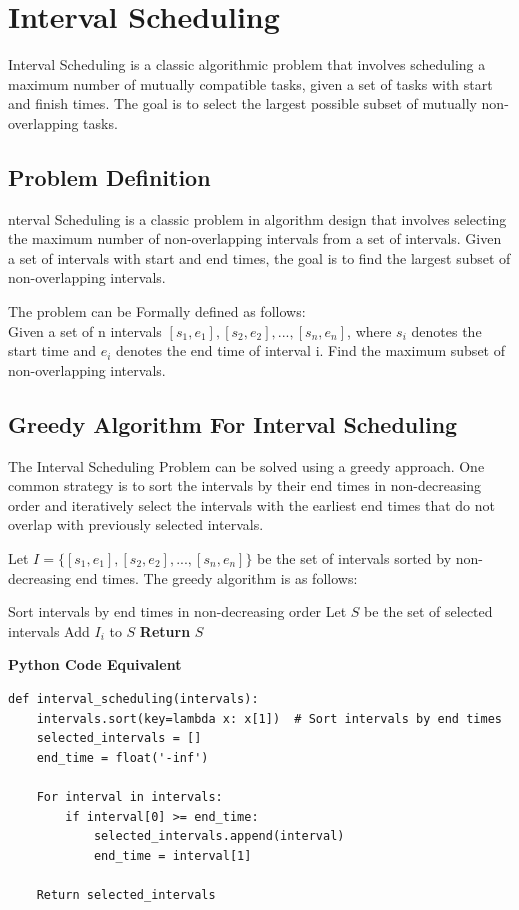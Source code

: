 \documentclass[12pt]{book} %
\begin{document}
\section{Interval Scheduling}
Interval Scheduling is a classic algorithmic problem that involves scheduling a maximum number of mutually compatible tasks, given a set of tasks with start and finish times. The goal is to select the largest possible subset of mutually non-overlapping tasks.

\subsection{Problem Definition}
nterval Scheduling is a classic problem in algorithm design that involves selecting the maximum number of non-overlapping intervals from a set of intervals. Given a set of intervals with start and end times, the goal is to find the largest subset of non-overlapping intervals.

The problem can be Formally defined as follows: \\
Given a set of n intervals $[s_1, e_1], [s_2, e_2], ..., [s_n, e_n]$, where $s_i$ denotes the start time and $e_i$ denotes the end time of interval i. Find the maximum subset of non-overlapping intervals.

\subsection{Greedy Algorithm For Interval Scheduling}
The Interval Scheduling Problem can be solved using a greedy approach. One common strategy is to sort the intervals by their end times in non-decreasing order and iteratively select the intervals with the earliest end times that do not overlap with previously selected intervals.

Let $I = \{[s_1, e_1], [s_2, e_2], ..., [s_n, e_n]\}$ be the set of intervals sorted by non-decreasing end times. The greedy algorithm is as follows:
\FloatBarrier
\begin{algorithm}
\caption{Interval Scheduling Algorithm}
\begin{algorithmic}[1]
\State Sort intervals by end times in non-decreasing order
\State Let $S$ be the set of selected intervals
\State Add $I_i$ to $S$
\EndIf
\EndFor
\State \textbf{Return} $S$
\end{algorithmic}
\end{algorithm}
\FloatBarrier
\textbf{Python Code Equivalent}
\begin{lstlisting}
def interval_scheduling(intervals):
    intervals.sort(key=lambda x: x[1])  # Sort intervals by end times
    selected_intervals = []
    end_time = float('-inf')
    
    For interval in intervals:
        if interval[0] >= end_time:
            selected_intervals.append(interval)
            end_time = interval[1]
    
    Return selected_intervals
\end{lstlisting}
\end{document}
